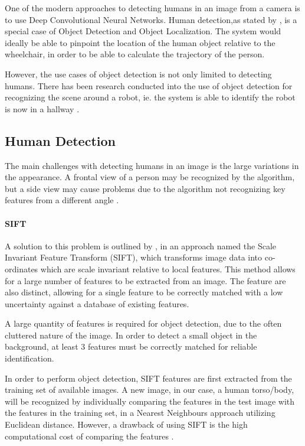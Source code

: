 \documentclass[12pt,a4paper]{report}
\begin{document}
One of the modern approaches to detecting humans in an image from a camera is to use Deep Convolutional Neural Networks. Human detection,as stated by \cite{Vidanapathirana}, is a special case of Object Detection and Object Localization. The system would ideally be able to pinpoint the location of the human object relative to the wheelchair, in order to be able to calculate the trajectory of the person.

However, the use cases of object detection is not only limited to detecting humans. There has been research conducted into the use of object detection for recognizing the scene around a robot, ie. the system is able to identify the robot is now in a hallway \citep{Quattoni2009, Espinace2010}.

\subsection{Human Detection}
The main challenges with detecting humans in an image is the large variations in the appearance. A frontal view of a person may be recognized by the algorithm, but a side view may cause problems due to the algorithm not recognizing key features from a different angle \citep{Dalal2004}.

\paragraph{SIFT} A solution to this problem is outlined by \cite{Lowe2004}, in an approach named the Scale Invariant Feature Transform (SIFT), which transforms image data into co-ordinates which are scale invariant relative to local features. This method allows for a large number of features to be extracted from an image. The feature are also distinct, allowing for a single feature to be correctly matched with a low uncertainty against a database of existing features.

A large quantity of features is required for object detection, due to the often cluttered nature of the image. In order to detect a small object in the background, at least 3 features must be correctly matched for reliable identification. 

In order to perform object detection, SIFT features are first extracted from the training set of available images. A new image, in our case, a human torso/body, will be recognized by individually comparing the features in the test image with the features in the training set, in a Nearest Neighbours approach utilizing Euclidean distance. However, a drawback of using SIFT is the high computational cost of comparing the features \citep{Wang2011}.
\end{document}
